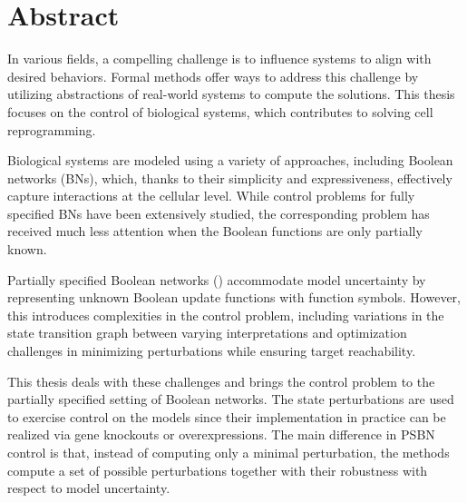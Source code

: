 


\begingroup
\let\clearpage\relax
\let\cleardoublepage\relax
\let\cleardoublepage\relax

\chapter*{Abstract}

In various fields, a compelling challenge is to influence systems to align with desired behaviors. Formal methods offer ways to address this challenge by utilizing abstractions of real-world systems to compute the solutions. This thesis focuses on the control of biological systems, which contributes to solving cell reprogramming.

Biological systems are modeled using a variety of approaches, including Boolean networks (BNs), which, thanks to their simplicity and expressiveness, effectively capture interactions at the cellular level. While control problems for fully specified BNs have been extensively studied, the corresponding problem has received much less attention when the Boolean functions are only partially known.

Partially specified Boolean networks () accommodate model uncertainty by representing unknown Boolean update functions with function symbols. However, this introduces complexities in the control problem, including variations in the state transition graph between varying interpretations and optimization challenges in minimizing perturbations while ensuring target reachability.

This thesis deals with these challenges and brings the control problem to the partially specified setting of Boolean networks. The state perturbations are used to exercise control on the models since their implementation in practice can be realized via gene knockouts or overexpressions. The main difference in PSBN control is that, instead of computing only a minimal perturbation, the methods compute a set of possible perturbations together with their robustness with respect to model uncertainty.

